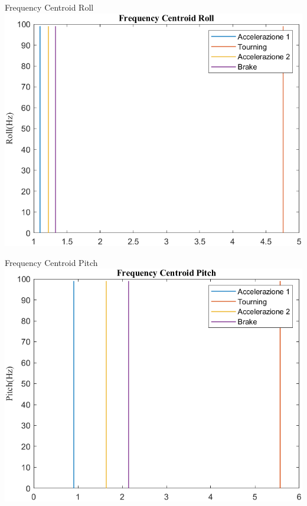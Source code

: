 \documentclass[beamer]{standalone}
\begin{document}
	\begin{frame}{{Frequency Centroid Roll}}
		\centering\includegraphics[height=.8\textheight]{figure/VAng/Trasformata/Frequency CentroidRoll}
	\end{frame}
	
	\begin{frame}{{Frequency Centroid Pitch}}
		\centering\includegraphics[height=.8\textheight]{figure/VAng/Trasformata/Frequency CentroidPitch}
	\end{frame}
	
\end{document}
